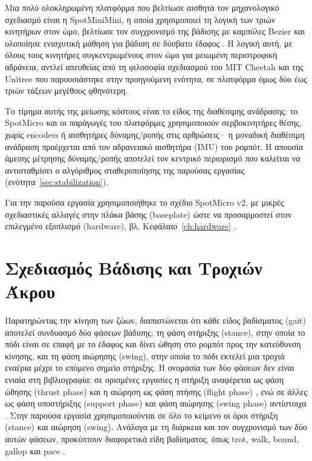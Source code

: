 \documentclass[11pt]{report}
\begin{document}
Μια πολύ ολοκληρωμένη πλατφόρμα που βελτίωσε αισθητά τον μηχανολογικό σχεδιασμό
είναι η SpotMiniMini, η οποία χρησιμοποιεί τη λογική των τριών κινητήρων στον
ώμο, βελτίωσε τον συγχρονισμό της βάδισης με καμπύλες Bezier και υλοποίησε
ενισχυτική μάθηση για βάδιση σε δύσβατο έδαφος \cite{spotminimini2020github}. Η
λογική αυτή, με όλους τους κινητήρες συγκεντρωμένους στον ώμο για μειωμένη
περιστροφική αδράνεια, αντλεί απευθείας από τη φιλοσοφία σχεδιασμού του MIT
Cheetah και της Unitree που παρουσιάστηκε στην προηγούμενη ενότητα, σε
πλατφόρμα όμως δύο έως τριών τάξεων μεγέθους φθηνότερη.

Το τίμημα αυτής της μείωσης κόστους είναι το είδος της διαθέσιμης ανάδρασης: το
SpotMicro και οι παράγωγές του πλατφόρμες χρησιμοποιούν
σερβοκινητήρες θέσης, χωρίς encoders ή αισθητήρες δύναμης/ροπής στις
αρθρώσεις· η μοναδική διαθέσιμη ανάδραση προέρχεται από τον αδρανειακό
αισθητήρα (IMU) του ρομπότ. Η απουσία άμεσης μέτρησης δύναμης/ροπής αποτελεί
τον κεντρικό περιορισμό που καλείται να αντισταθμίσει ο αλγόριθμος
σταθεροποίησης της παρούσας εργασίας (ενότητα~\ref{sec:stabilization}).

Για την παρούσα εργασία χρησιμοποιήθηκε το σχέδιο SpotMicro v2, με μικρές
σχεδιαστικές αλλαγές στην πλάκα βάσης (baseplate) ώστε να προσαρμοστεί στον
επιλεγμένο εξοπλισμό (hardware), βλ. Κεφάλαιο~\ref{ch:hardware}
\cite{taibo_spotmicro_2020}.

\section{Σχεδιασμός Βάδισης και Τροχιών Άκρου}
Παρατηρώντας την κίνηση των ζώων, διαπιστώνεται ότι κάθε είδος βαδίσματος
(gait) αποτελεί συνδυασμό δύο φάσεων βάδισης:
τη φάση στήριξης (stance), στην οποία το πόδι είναι σε επαφή με το έδαφος
και δίνει ώθηση στο ρομπότ προς την κατεύθυνση κίνησης, και τη φάση αιώρησης
(swing), στην οποία
το πόδι εκτελεί μια τροχιά εναέρια μέχρι το επόμενο σημείο στήριξης. Η
ονομασία των δύο φάσεων δεν είναι ενιαία στη βιβλιογραφία: σε ορισμένες
εργασίες η στήριξη αναφέρεται ως φάση ώθησης (thrust phase) και η αιώρηση ως
φάση πτήσης (flight phase) \cite{lee_turning_2014}, ενώ σε άλλες ως φάση
υποστήριξης (support phase) και φάση αιώρησης (swing phase) αντίστοιχα
\cite{liu_turning_2017}. Στην παρούσα εργασία χρησιμοποιούνται σε όλο το κείμενο
οι όροι στήριξη (stance) και αιώρηση (swing). Ανάλογα με τη διάρκεια
και τον συγχρονισμό των δύο
αυτών φάσεων, προκύπτουν διαφορετικά είδη βαδίσματος, όπως trot, walk, bound,
gallop και pace \cite{silva_review_2026}.
\end{document}
